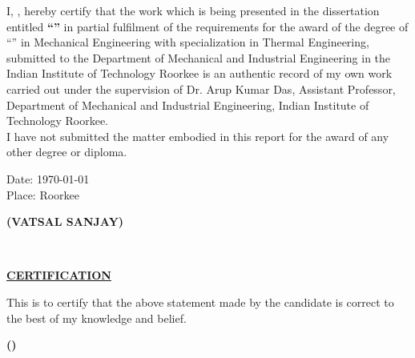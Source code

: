 \begin{declaration}
\noindent I, \authorname, hereby certify that the work which is being presented in the dissertation entitled {\bf\enquote{\ttitle}} in partial fulfilment of the requirements for the award of the degree of \enquote{\degreename} in Mechanical Engineering with specialization in Thermal Engineering, submitted to the Department of Mechanical and Industrial Engineering in the Indian Institute of Technology Roorkee is an  authentic record of my own work carried out under the supervision of Dr. Arup Kumar Das, Assistant Professor, Department of Mechanical and Industrial Engineering, Indian Institute of Technology Roorkee.\\
I have not submitted the matter embodied in this report for the award of any other degree or diploma.\\
\begin{minipage}{0.5\linewidth}\vspace{2.5cm}
\begin{flushleft}
Date: \today\\
Place: Roorkee
\end{flushleft}
\end{minipage}
\begin{minipage}{0.5\linewidth}\vspace{2.5cm}
\begin{flushright}
\textbf{(VATSAL SANJAY)}
\end{flushright} 
\end{minipage}\vspace{10mm}
\HRule\\
\begin{center}
{\large\bfseries\underline{CERTIFICATION}\par}
\end{center}
This is to certify that the above statement made by the candidate is correct to the best of my knowledge and belief.\\
\begin{minipage}{0.5\linewidth}\vspace{2.5cm}
\hfill
\end{minipage}
\begin{minipage}{0.5\linewidth}\vspace{2.5cm}
\flushright
\textbf{(\supname)}
\end{minipage}
\end{declaration}